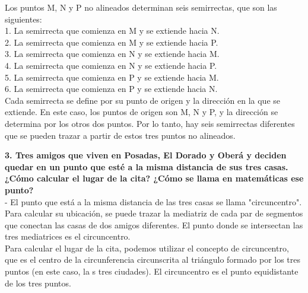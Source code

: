 \documentclass{article}
\begin{document}
Los puntos M, N y P no alineados determinan seis semirrectas, que son las siguientes: \\

1. La semirrecta que comienza en M y se extiende hacia N.\\
2. La semirrecta que comienza en M y se extiende hacia P.\\
3. La semirrecta que comienza en N y se extiende hacia M.\\
4. La semirrecta que comienza en N y se extiende hacia P.\\
5. La semirrecta que comienza en P y se extiende hacia M.\\
6. La semirrecta que comienza en P y se extiende hacia N.\\

Cada semirrecta se define por su punto de origen y la dirección en la que se extiende. En este caso, los puntos de origen son M, N y P, y la dirección se determina por los otros dos puntos. Por lo tanto, hay seis semirrectas diferentes que se pueden trazar a partir de estos tres puntos no alineados.


{\bf 3. Tres amigos que viven en Posadas, El Dorado y Oberá y deciden quedar en un punto que esté a la misma distancia de sus tres casas. ¿Cómo calcular el lugar de la cita? ¿Cómo se llama en matemáticas ese punto? } \\

- El punto que está a la misma distancia de las tres casas se llama "circuncentro". Para calcular su ubicación, se puede trazar la mediatriz de cada par de segmentos que conectan las casas de dos amigos diferentes. El punto donde se intersectan las tres mediatrices es el circuncentro. \\


Para calcular el lugar de la cita, podemos utilizar el concepto de circuncentro, que es el centro de la circunferencia circunscrita al triángulo formado por los tres puntos (en este caso, la s tres ciudades). El circuncentro es el punto equidistante de los tres puntos. \\
\end{document}
